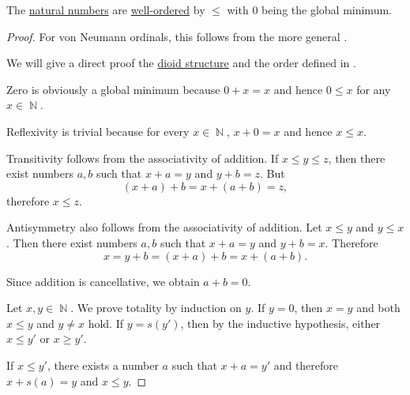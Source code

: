 \begin{proposition}\label{thm:natural_numbers_are_well_ordered}
  The \hyperref[def:set_of_natural_numbers]{natural numbers} are \hyperref[def:well_ordered_set]{well-ordered} by \hyperref[def:natural_number_ordering]{\( \leq \)} with \( 0 \) being the global minimum.
\end{proposition}
\begin{proof}
  For von Neumann ordinals, this follows from the more general .

  We will give a direct proof the \hyperref[thm:natural_numbers_form_dioid]{dioid structure} and the order defined in .

  Zero is obviously a global minimum because \( 0 + x = x \) and hence \( 0 \leq x \) for any \( x \in \BbbN \).

   Reflexivity is trivial because for every \( x \in \BbbN \), \( x + 0 = x \) and hence \( x \leq x \).

   Transitivity follows from the associativity of addition. If \( x \leq y \leq z \), then there exist numbers \( a, b \) such that \( x + a = y \) and \( y + b = z \). But
  \begin{equation*}
    (x + a) + b = x + (a + b) = z,
  \end{equation*}
  therefore \( x \leq z \).

   Antisymmetry also follows from the associativity of addition. Let \( x \leq y \) and \( y \leq x \). Then there exist numbers \( a, b \) such that \( x + a = y \) and \( y + b = x \). Therefore
  \begin{equation*}
    x = y + b = (x + a) + b = x + (a + b).
  \end{equation*}

  Since addition is cancellative, we obtain \( a + b = 0 \).

   Let \( x, y \in \BbbN \). We prove totality by induction on \( y \). If \( y = 0 \), then \( x = y \) and both \( x \leq y \) and \( y \neq x \) hold. If \( y = s(y') \), then by the inductive hypothesis, either \( x \leq y' \) or \( x \geq y' \).

  If \( x \leq y' \), there exists a number \( a \) such that \( x + a = y' \) and therefore \( x + s(a) = y \) and \( x \leq y \).


\end{proof}
